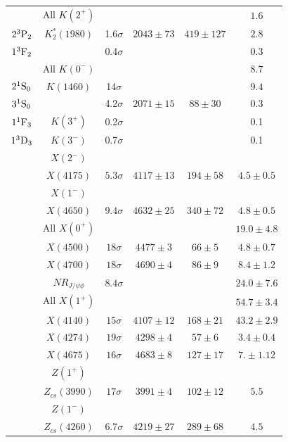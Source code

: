 \begin{table}[tbph]
\begin{center}
\begin{tabular}{cccccc}
& All $K(2^+)$ &  & & & $1.6$\\
$2{}^{3}{\rm P}_{2}$  &  $K^*_2(1980)$  & 1.6$\sigma$    & $2043\pm73$ & $419\pm127$    & $2.8$ \\
$1{}^{3}{\rm F}_{2}$  &       &      0.4$\sigma$  &   &        & $0.3$  \\
\hline 
& All $K(0^-)$& & & & $8.7$\\
$2{}^{1}{\rm S}_{0}$  &  $K(1460)$    & 14$\sigma$      &    &                        & $9.4$    \\  
$3{}^{1}{\rm S}_{0}$  &               & 4.2$\sigma$      &$2071\pm15$  & $88\pm30$ & $0.3$ \\
\hline 
$1{}^{1}{\rm F}_{3}$  &  $K(3^+)$     &0.2$\sigma$       &   &    & 0.1 \\
\hline 
$1{}^{3}{\rm D}_{3}$  &  $K(3^-)$     &0.7$\sigma$       &  &   & 0.1 \\

\hline 
\hline
&$X(2^-)$ & & & &   \\
  &$X(4175)$ & $5.3\sigma$ & $4117\pm 13$ & $194\pm58$ & $4.5\pm0.5$ \\
\hline
&$X(1^-)$ & & & &   \\
  &$X(4650)$ & $9.4\sigma$ & $4632\pm 25$ & $340\pm72$ & $4.8\pm0.5$ \\
\hline

 &All $X(0^+)$ & & & & $19.0\pm4.8$  \\
 &$X(4500)$ & $18\sigma$ & $4477\pm 3$ & $66\pm5$ &  $4.8\pm0.7$ \\
 &$X(4700)$ & $18\sigma$ & $4690\pm 4$ & $86\pm9$ & $8.4\pm1.2$ \\
 &$NR_{J/\psi \phi}$ & $8.4 \sigma $& & &$24.0\pm7.6$ \\
\hline
 &All $X(1^+)$ & & & & $54.7\pm3.4$ \\
 &$X(4140)$ & $15\sigma$ & $4107\pm 12$ & $168\pm21$ & $43.2\pm2.9$ \\
 &$X(4274)$ & $19\sigma$ & $4298\pm 4$ & $57\pm6$   & $3.4\pm0.4$ \\
 &$X(4675)$ & $16\sigma$ & $4683\pm 8$ & $127\pm17$ & $7.\pm1.12$ \\
\hline\hline
&$Z(1^+)$ \\
  &$Z_{cs}(3990)$ & $17\sigma$ & $3991\pm 4$ & $102\pm12$ & $5.5$ \\
  \hline
&$Z(1^-)$ \\
  &$Z_{cs}(4260)$ & $6.7\sigma$ & $4219\pm 27$ & $289\pm68$ & $4.5$ \\
\hline
\end{tabular}
\end{center}
\end{table}
\fi


